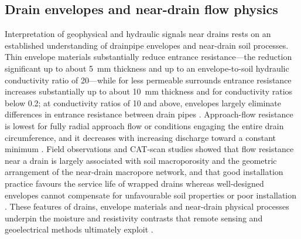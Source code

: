 \documentclass[11pt]{article}
\begin{document}
\subsection{Drain envelopes and near-drain flow physics}

Interpretation of geophysical and hydraulic signals near drains rests on an established understanding of drainpipe envelopes and near-drain soil processes. Thin envelope materials substantially reduce entrance resistance---the reduction significant up to about 5~mm thickness and up to an envelope-to-soil hydraulic conductivity ratio of 20---while for less permeable surrounds entrance resistance increases substantially up to about 10~mm thickness and for conductivity ratios below 0.2; at conductivity ratios of 10 and above, envelopes largely eliminate differences in entrance resistance between drain pipes \parencite{Stuyt2006}. Approach-flow resistance is lowest for fully radial approach flow or conditions engaging the entire drain circumference, and it decreases with increasing discharge toward a constant minimum \parencite{Stuyt2006}. Field observations and CAT-scan studies showed that flow resistance near a drain is largely associated with soil macroporosity and the geometric arrangement of the near-drain macropore network, and that good installation practice favours the service life of wrapped drains whereas well-designed envelopes cannot compensate for unfavourable soil properties or poor installation \parencite{Stuyt2006}. These features of drains, envelope materials and near-drain physical processes underpin the moisture and resistivity contrasts that remote sensing and geoelectrical methods ultimately exploit \parencite{Stuyt2006}.

\printbibliography
\end{document}
